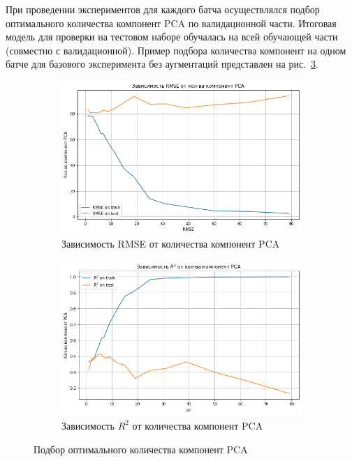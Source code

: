 \documentclass[a4paper,14pt]{article}
\begin{document}
    При проведении экспериментов для каждого батча осуществлялся подбор оптимального количества компонент PCA по валидационной части. Итоговая модель для проверки на тестовом наборе обучалась на всей обучающей части (совместно с валидационной).
    Пример подбора количества компонент на одном батче для базового эксперимента без аугментаций представлен на рис.~\ref{fig:pca_optim}.

    \begin{figure}[H]
        \centering
        \begin{subfigure}{.5\textwidth}
            \centering
            \includegraphics[width=\linewidth]{images/pca_rmse}
            \caption{Зависимость RMSE от количества компонент PCA}
            \label{fig:pca_rmse}
        \end{subfigure}%
        \begin{subfigure}{.5\textwidth}
            \centering
            \includegraphics[width=\linewidth]{images/pca_r2}
            \caption{Зависимость $R^2$ от количества компонент PCA}
            \label{fig:pca_r2}
        \end{subfigure}
        \caption{Подбор оптимального количества компонент PCA}
        \label{fig:pca_optim}
    \end{figure}
\end{document}
